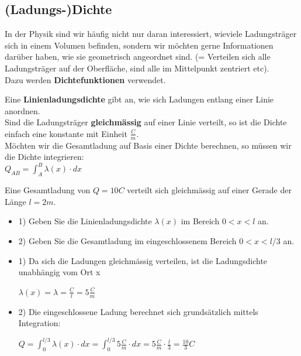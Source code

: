 \subsection{(Ladungs-)Dichte}
In der Physik sind wir häufig nicht nur daran interessiert, wieviele Ladungsträger sich in einem Volumen befinden, sondern wir möchten gerne Informationen darüber haben, wie sie geometrisch angeordnet sind. (= Verteilen sich alle Ladungsträger auf der Oberfläche, sind alle im Mittelpunkt zentriert etc). \\
Dazu werden \textbf{Dichtefunktionen} verwendet.

\beginip
Eine \textbf{Linienladungsdichte} gibt an, wie sich Ladungen entlang einer Linie anordnen. \\
Sind die Ladungsträger \textbf{gleichmässig} auf einer Linie verteilt, so ist die Dichte einfach eine konstante mit Einheit $\frac{C}{m}$. \\
Möchten wir die Gesamtladung auf Basis einer Dichte berechnen, so müssen wir die Dichte integrieren: \\
\formulaBegin
	$\displaystyle Q_{AB} = \int_A^B \lambda (x) \cdot dx$
\formulaEnd
\iend

\beginbsp
	Eine Gesamtladung von $Q=10C$ verteilt sich gleichmässig auf einer Gerade der Länge $l = 2m$. \\
	\begin{itemize}
		\item 1) Geben Sie die Linienladungsdichte $\lambda(x)$ im Bereich $ 0 < x <l$ an.
		\item 2) Geben Sie die Gesamtladung im eingeschlossenem Bereich $ 0 < x < l/3$ an.
	\end{itemize}
\iend

\newpage
{}
\beginbsp
\begin{itemize}
	\item 1) Da sich die Ladungen gleichmässig verteilen, ist die Ladungsdichte unabhängig vom Ort x
	\begin{center}
		$\lambda(x) = \lambda = \frac{C}{l} = 5 \frac{C}{m}$
	\end{center}
	\item 2) Die eingeschlossene Ladung berechnet sich grundsätzlich mittels Integration:
	\begin{center}
		$\displaystyle Q = \int_0^{l/3} \lambda(x) \cdot dx = \int_0^{l/3} 5 \frac{C}{m} \cdot dx = 5 \frac{C}{m} \cdot \frac{l}{3} = \frac{10}{3} C$
	\end{center}
\end{itemize}
\iend










